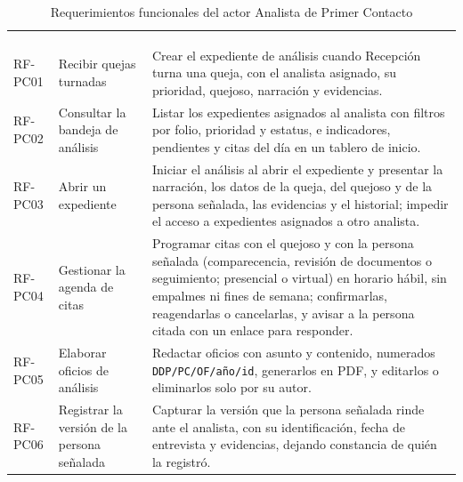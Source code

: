 	\begin{longtable}{|L{1.7cm}|L{4.0cm}|L{9.9cm}|}
		\hiderowcolors\caption{Requerimientos funcionales del actor Analista de Primer Contacto}
		\label{tab:rf_pc} \\ \showrowcolors
		\hline
		 &  &  \\
		\hline
		\endfirsthead

		\hline
		 &  &  \\
		\hline
		\endhead

		RF-PC01 & Recibir quejas turnadas & Crear el expediente de análisis cuando Recepción turna una
		queja, con el analista asignado, su prioridad, quejoso, narración y evidencias. \\ \hline

		RF-PC02 & Consultar la bandeja de análisis & Listar los expedientes asignados al analista con
		filtros por folio, prioridad y estatus, e indicadores, pendientes y citas del día en un tablero
		de inicio. \\ \hline

		RF-PC03 & Abrir un expediente & Iniciar el análisis al abrir el expediente y presentar la
		narración, los datos de la queja, del quejoso y de la persona señalada, las evidencias y el
		historial; impedir el acceso a expedientes asignados a otro analista. \\ \hline

		RF-PC04 & Gestionar la agenda de citas & Programar citas con el quejoso y con la persona
		señalada (comparecencia, revisión de documentos o seguimiento; presencial o virtual) en horario
		hábil, sin empalmes ni fines de semana; confirmarlas, reagendarlas o cancelarlas, y avisar a la
		persona citada con un enlace para responder. \\ \hline

		RF-PC05 & Elaborar oficios de análisis & Redactar oficios con asunto y contenido, numerados
		\texttt{DDP/PC/OF/año/id}, generarlos en PDF, y editarlos o eliminarlos solo por su autor.
		\\ \hline

		RF-PC06 & Registrar la versión de la persona señalada & Capturar la versión que la persona
		señalada rinde ante el analista, con su identificación, fecha de entrevista y evidencias,
		dejando constancia de quién la registró. \\ \hline


\end{longtable}
